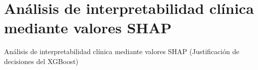 \section{Análisis de interpretabilidad clínica mediante valores SHAP}
    Análisis de interpretabilidad clínica mediante valores SHAP (Justificación de decisiones del XGBoost)